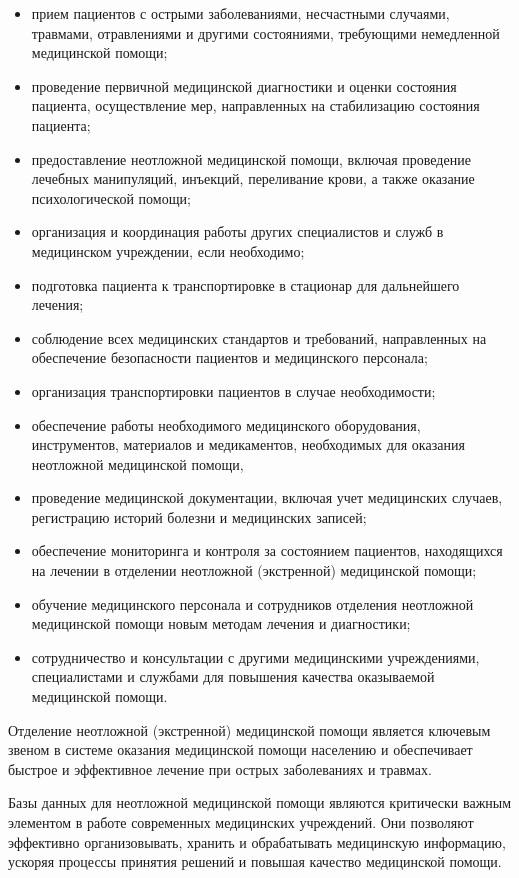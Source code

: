 \begin{itemize}
    \item прием пациентов с острыми заболеваниями, несчастными случаями, травмами, отравлениями и другими состояниями, требующими немедленной медицинской помощи;
    \item проведение первичной медицинской диагностики и оценки состояния пациента, осуществление мер, направленных на стабилизацию состояния пациента;
    \item предоставление неотложной медицинской помощи, включая проведение лечебных манипуляций, инъекций, переливание крови, а также оказание психологической помощи;
    \item организация и координация работы других специалистов и служб в медицинском учреждении, если необходимо;
    \item подготовка пациента к транспортировке в стационар для дальнейшего лечения;
    \item соблюдение всех медицинских стандартов и требований, направленных на обеспечение безопасности пациентов и медицинского персонала;
    \item организация транспортировки пациентов в случае необходимости;
    \item обеспечение работы необходимого медицинского оборудования, инструментов, материалов и медикаментов, необходимых для оказания неотложной медицинской помощи,
    \item проведение медицинской документации, включая учет медицинских случаев, регистрацию историй болезни и медицинских записей;
    \item обеспечение мониторинга и контроля за состоянием пациентов, находящихся на лечении в отделении неотложной (экстренной) медицинской помощи;
    \item обучение медицинского персонала и сотрудников отделения неотложной медицинской помощи новым методам лечения и диагностики;
    \item сотрудничество и консультации с другими медицинскими учреждениями, специалистами и службами для повышения качества оказываемой медицинской помощи.
\end{itemize}

Отделение неотложной (экстренной) медицинской помощи является ключевым звеном в системе оказания медицинской помощи населению и обеспечивает быстрое и эффективное лечение при острых заболеваниях и травмах.

Базы данных для неотложной медицинской помощи являются критически важным элементом в работе современных медицинских учреждений. Они позволяют эффективно организовывать, хранить и обрабатывать медицинскую информацию, ускоряя процессы принятия решений и повышая качество медицинской помощи.

